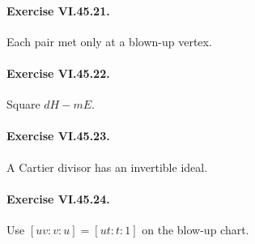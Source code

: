 \paragraph{Exercise VI.45.21.}
\begin{hint}
Each pair met only at a blown-up vertex.
\end{hint}

\paragraph{Exercise VI.45.22.}
\begin{hint}
Square \(dH-mE\).
\end{hint}

\paragraph{Exercise VI.45.23.}
\begin{hint}
A Cartier divisor has an invertible ideal.
\end{hint}

\paragraph{Exercise VI.45.24.}
\begin{hint}
Use \([uv:v:u]=[ut:t:1]\) on the blow-up chart.
\end{hint}
